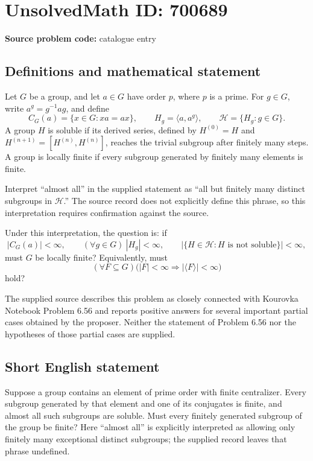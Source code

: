 \documentclass[11pt]{article}
\begin{document}
\section*{UnsolvedMath ID: 700689}
\textbf{Source problem code:} catalogue entry
\subsection{Definitions and mathematical statement}
Let \(G\) be a group, and let \(a\in G\) have order \(p\), where \(p\) is a prime. For \(g\in G\), write \(a^g=g^{-1}ag\), and define
\[
C_G(a)=\{x\in G:xa=ax\},\qquad H_g=\langle a,a^g\rangle,\qquad \mathcal H=\{H_g:g\in G\}.
\]
A group \(H\) is soluble if its derived series, defined by \(H^{(0)}=H\) and \(H^{(n+1)}=[H^{(n)},H^{(n)}]\), reaches the trivial subgroup after finitely many steps. A group is locally finite if every subgroup generated by finitely many elements is finite.

Interpret ``almost all'' in the supplied statement as ``all but finitely many distinct subgroups in \(\mathcal H\).'' The source record does not explicitly define this phrase, so this interpretation requires confirmation against the source.

Under this interpretation, the question is: if
\[
|C_G(a)|<\infty,\qquad (\forall g\in G)\ |H_g|<\infty,\qquad
\bigl|\{H\in\mathcal H:H\text{ is not soluble}\}\bigr|<\infty,
\]
must \(G\) be locally finite? Equivalently, must
\[
(\forall F\subseteq G)\bigl(|F|<\infty\Longrightarrow |\langle F\rangle|<\infty\bigr)
\]
hold?

The supplied source describes this problem as closely connected with Kourovka Notebook Problem 6.56 and reports positive answers for several important partial cases obtained by the proposer. Neither the statement of Problem 6.56 nor the hypotheses of those partial cases are supplied.
\subsection{Short English statement}
Suppose a group contains an element of prime order with finite centralizer. Every subgroup generated by that element and one of its conjugates is finite, and almost all such subgroups are soluble. Must every finitely generated subgroup of the group be finite? Here ``almost all'' is explicitly interpreted as allowing only finitely many exceptional distinct subgroups; the supplied record leaves that phrase undefined.
\end{document}
